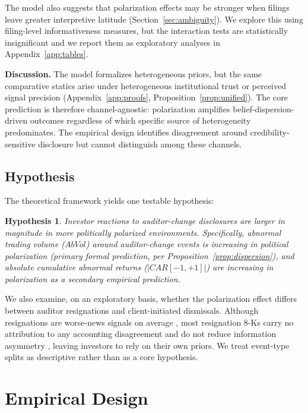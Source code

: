\documentclass[12pt]{article}
\newtheorem{hyp}{Hypothesis}
\begin{document}
The model also suggests that polarization effects may be stronger when
filings leave greater interpretive latitude (Section~\ref{sec:ambiguity}).
We explore this using filing-level informativeness measures, but the
interaction tests are statistically insignificant and we report them as
exploratory analyses in Appendix~\ref{app:tables}.

\textbf{Discussion.} The model formalizes heterogeneous priors, but the
same comparative statics arise under heterogeneous institutional trust
or perceived signal precision (Appendix~\ref{app:proofs},
Proposition~\ref{prop:unified}). The core prediction is therefore
channel-agnostic: polarization amplifies belief-dispersion-driven
outcomes regardless of which specific source of heterogeneity
predominates. The empirical design identifies disagreement around
credibility-sensitive disclosure but cannot distinguish among these
channels.

\subsection{Hypothesis}
\label{sec:hypotheses}

The theoretical framework yields one testable hypothesis:

\begin{hyp}
    \label{h1}
    Investor reactions to auditor-change disclosures are larger in magnitude
    in more politically polarized environments. Specifically, abnormal
    trading volume ($AbVol$) around auditor-change events is increasing in
    political polarization (primary formal prediction, per
    Proposition~\ref{prop:dispersion}), and absolute cumulative abnormal
    returns ($|CAR[-1,+1]|$) are increasing in polarization as a secondary
    empirical prediction.
\end{hyp}

We also examine, on an exploratory basis, whether the polarization
effect differs between auditor resignations and client-initiated
dismissals. Although resignations are worse-news signals on average
\citep{ghosh2015, beneish2005}, most resignation 8-Ks carry no
attribution to any accounting disagreement \citep{beneish2005} and do
not reduce information asymmetry \citep{boone2001}, leaving investors to
rely on their own priors. We treat event-type splits as descriptive
rather than as a core hypothesis.


\section{Empirical Design}
\label{sec:design}
\end{document}
